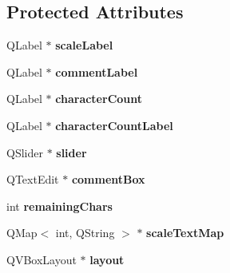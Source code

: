 \subsection*{Protected Attributes}
\begin{DoxyCompactItemize}
\item 
\hypertarget{class_evaluation_a591ee0e752f624f4dae91882bc57d7c2}{Q\-Label $\ast$ {\bfseries scale\-Label}}\label{class_evaluation_a591ee0e752f624f4dae91882bc57d7c2}

\item 
\hypertarget{class_evaluation_aab8ddd8a9f4fd269d550316833286ec3}{Q\-Label $\ast$ {\bfseries comment\-Label}}\label{class_evaluation_aab8ddd8a9f4fd269d550316833286ec3}

\item 
\hypertarget{class_evaluation_a9e8403e8ef73bcf4bca340b7c7a32ffe}{Q\-Label $\ast$ {\bfseries character\-Count}}\label{class_evaluation_a9e8403e8ef73bcf4bca340b7c7a32ffe}

\item 
\hypertarget{class_evaluation_a2c5368c278af415a12be2dc416bc1261}{Q\-Label $\ast$ {\bfseries character\-Count\-Label}}\label{class_evaluation_a2c5368c278af415a12be2dc416bc1261}

\item 
\hypertarget{class_evaluation_a276bdbdd36c197811002d48dda46fcaa}{Q\-Slider $\ast$ {\bfseries slider}}\label{class_evaluation_a276bdbdd36c197811002d48dda46fcaa}

\item 
\hypertarget{class_evaluation_a02b96d6ec1664ad5af6b6263331e2ac4}{Q\-Text\-Edit $\ast$ {\bfseries comment\-Box}}\label{class_evaluation_a02b96d6ec1664ad5af6b6263331e2ac4}

\item 
\hypertarget{class_evaluation_ac468cfc7353933fe9ed14e7307f2c6aa}{int {\bfseries remaining\-Chars}}\label{class_evaluation_ac468cfc7353933fe9ed14e7307f2c6aa}

\item 
\hypertarget{class_evaluation_a24d7ae8c5320d3520954e1b7db73612c}{Q\-Map$<$ int, Q\-String $>$ $\ast$ {\bfseries scale\-Text\-Map}}\label{class_evaluation_a24d7ae8c5320d3520954e1b7db73612c}

\item 
\hypertarget{class_evaluation_a93a2cbf56a193cec187bb71f1c3ccbd8}{Q\-V\-Box\-Layout $\ast$ {\bfseries layout}}\label{class_evaluation_a93a2cbf56a193cec187bb71f1c3ccbd8}

\end{DoxyCompactItemize}


